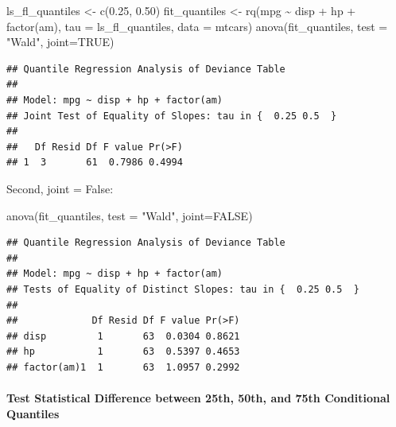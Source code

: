 \documentclass[
]{book}
\newenvironment{Shaded}{\begin{snugshade}}{\end{snugshade}}
\newcommand{\AttributeTok}[1]{\textcolor[rgb]{0.77,0.63,0.00}{#1}}
\newcommand{\ConstantTok}[1]{\textcolor[rgb]{0.00,0.00,0.00}{#1}}
\newcommand{\FloatTok}[1]{\textcolor[rgb]{0.00,0.00,0.81}{#1}}
\newcommand{\FunctionTok}[1]{\textcolor[rgb]{0.00,0.00,0.00}{#1}}
\newcommand{\NormalTok}[1]{#1}
\newcommand{\OtherTok}[1]{\textcolor[rgb]{0.56,0.35,0.01}{#1}}
\newcommand{\SpecialCharTok}[1]{\textcolor[rgb]{0.00,0.00,0.00}{#1}}
\newcommand{\StringTok}[1]{\textcolor[rgb]{0.31,0.60,0.02}{#1}}
\begin{document}
\begin{Shaded}
\begin{Highlighting}[]
\NormalTok{ls\_fl\_quantiles }\OtherTok{\textless{}{-}} \FunctionTok{c}\NormalTok{(}\FloatTok{0.25}\NormalTok{, }\FloatTok{0.50}\NormalTok{)}
\NormalTok{fit\_quantiles }\OtherTok{\textless{}{-}} \FunctionTok{rq}\NormalTok{(mpg }\SpecialCharTok{\textasciitilde{}}\NormalTok{ disp }\SpecialCharTok{+}\NormalTok{ hp }\SpecialCharTok{+} \FunctionTok{factor}\NormalTok{(am),}
               \AttributeTok{tau =}\NormalTok{ ls\_fl\_quantiles,}
               \AttributeTok{data =}\NormalTok{ mtcars)}
\FunctionTok{anova}\NormalTok{(fit\_quantiles, }\AttributeTok{test =} \StringTok{"Wald"}\NormalTok{, }\AttributeTok{joint=}\ConstantTok{TRUE}\NormalTok{)}
\end{Highlighting}
\end{Shaded}

\begin{verbatim}
## Quantile Regression Analysis of Deviance Table
## 
## Model: mpg ~ disp + hp + factor(am)
## Joint Test of Equality of Slopes: tau in {  0.25 0.5  }
## 
##   Df Resid Df F value Pr(>F)
## 1  3       61  0.7986 0.4994
\end{verbatim}

Second, joint = False:

\begin{Shaded}
\begin{Highlighting}[]
\FunctionTok{anova}\NormalTok{(fit\_quantiles, }\AttributeTok{test =} \StringTok{"Wald"}\NormalTok{, }\AttributeTok{joint=}\ConstantTok{FALSE}\NormalTok{)}
\end{Highlighting}
\end{Shaded}

\begin{verbatim}
## Quantile Regression Analysis of Deviance Table
## 
## Model: mpg ~ disp + hp + factor(am)
## Tests of Equality of Distinct Slopes: tau in {  0.25 0.5  }
## 
##             Df Resid Df F value Pr(>F)
## disp         1       63  0.0304 0.8621
## hp           1       63  0.5397 0.4653
## factor(am)1  1       63  1.0957 0.2992
\end{verbatim}

\hypertarget{test-statistical-difference-between-25th-50th-and-75th-conditional-quantiles}{%
\paragraph{Test Statistical Difference between 25th, 50th, and 75th Conditional Quantiles}\label{test-statistical-difference-between-25th-50th-and-75th-conditional-quantiles}}
\end{document}
